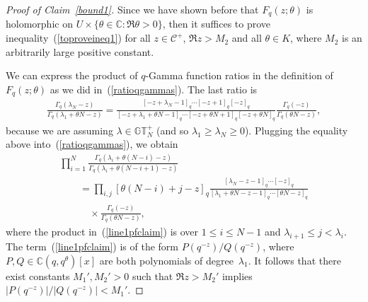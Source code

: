 \documentclass[11pt]{article}
\numberwithin{equation}{section}
\newcommand{\C}{\mathbb{C}}
\newcommand{\CC}{\mathcal{C}}
\newcommand{\GTp}{\mathbb{GT}^+}
\begin{document}
\begin{proof}[Proof of Claim~\ref{bound1}]
Since we have shown before that $F_q(z; \theta)$ is holomorphic on $U\times\{\theta\in\C\colon \Re\theta > 0\}$, then it suf\/f\/ices to prove inequality~(\ref{toproveineq1}) for all $z\in\CC^+$, $\Re z > M_2$ and all $\theta\in K$, where $M_2$ is an arbitrarily large positive constant.

We can express the product of $q$-Gamma function ratios in the def\/inition of $F_q(z; \theta)$ as we did in~(\ref{ratioqgammas}). The last ratio is
\begin{gather*}
\frac{\Gamma_q(\lambda_N - z)}{\Gamma_q(\lambda_1 + \theta N - z)} = \frac{[-z + \lambda_N - 1]_q\cdots [-z+1]_q[-z]_q}{[-z + \lambda_1 + \theta N - 1]_q\cdots [-z + \theta N + 1]_q[-z + \theta N]_q}\frac{\Gamma_q(-z)}{\Gamma_q(\theta N - z)},
\end{gather*}
because we are assuming $\lambda\in\GTp_N$ (and so $\lambda_1 \geq \lambda_N \geq 0$). Plugging the equality above into~(\ref{ratioqgammas}), we obtain
\begin{gather}
\prod_{i=1}^N{\frac{\Gamma_q(\lambda_i + \theta(N - i) - z)}{\Gamma_q(\lambda_i + \theta(N - i + 1) - z) }} \nonumber\\
\qquad{} = \prod_{i, j}{ [\theta (N - i) + j - z]_q }\frac{[\lambda_N - z - 1]_q\cdots [-z]_q}{[\lambda_1 + \theta N - z - 1]_q\cdots [\theta N - z]_q}\label{line1pfclaim}\\
\qquad\quad{} \times\frac{\Gamma_q(-z)}{\Gamma_q(\theta N - z)},\label{line2pfclaim}
\end{gather}
where the product in~(\ref{line1pfclaim}) is over $1 \leq i \leq N-1$ and $\lambda_{i+1} \leq j < \lambda_i$.
The term~(\ref{line1pfclaim}) is of the form $P(q^{-z})/Q(q^{-z})$, where $P, Q\in\C(q, q^{\theta})[x]$ are both polynomials of degree~$\lambda_1$. It follows that there exist constants $M_1', M_2' > 0$ such that $\Re z > M_2'$ implies $|P(q^{-z})|/|Q(q^{-z})| < M_1'$.


\end{proof}
\end{document}
